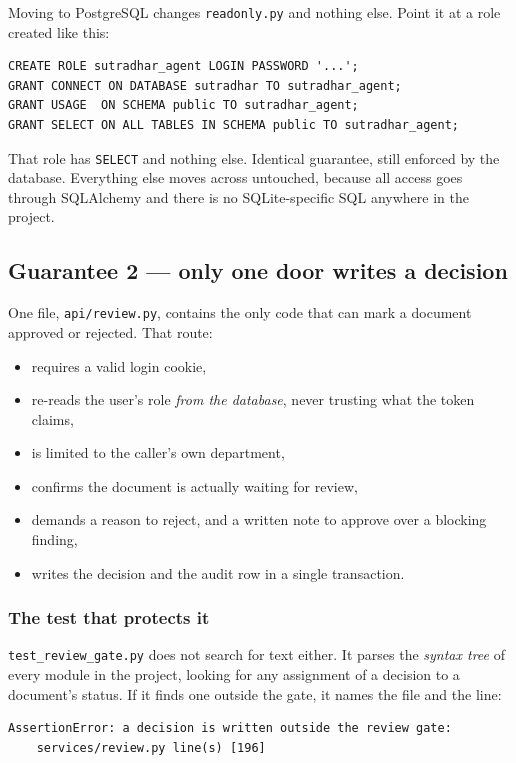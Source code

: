 \documentclass[11pt,a4paper]{article}
\begin{document}
Moving to PostgreSQL changes \texttt{readonly.py} and nothing else. Point it at
a role created like this:

\begin{lstlisting}
CREATE ROLE sutradhar_agent LOGIN PASSWORD '...';
GRANT CONNECT ON DATABASE sutradhar TO sutradhar_agent;
GRANT USAGE  ON SCHEMA public TO sutradhar_agent;
GRANT SELECT ON ALL TABLES IN SCHEMA public TO sutradhar_agent;
\end{lstlisting}

That role has \texttt{SELECT} and nothing else. Identical guarantee, still
enforced by the database. Everything else moves across untouched, because all
access goes through SQLAlchemy and there is no SQLite-specific SQL anywhere in
the project.

\subsection{Guarantee 2 --- only one door writes a decision}

One file, \texttt{api/review.py}, contains the only code that can mark a
document approved or rejected. That route:

\begin{itemize}
  \item requires a valid login cookie,
  \item re-reads the user's role \emph{from the database}, never trusting what
        the token claims,
  \item is limited to the caller's own department,
  \item confirms the document is actually waiting for review,
  \item demands a reason to reject, and a written note to approve over a
        blocking finding,
  \item writes the decision and the audit row in a single transaction.
\end{itemize}

\subsubsection*{The test that protects it}

\texttt{test\_review\_gate.py} does not search for text either. It parses the
\emph{syntax tree} of every module in the project, looking for any assignment of
a decision to a document's status. If it finds one outside the gate, it names
the file and the line:

\begin{lstlisting}
AssertionError: a decision is written outside the review gate:
    services/review.py line(s) [196]
\end{lstlisting}
\end{document}
